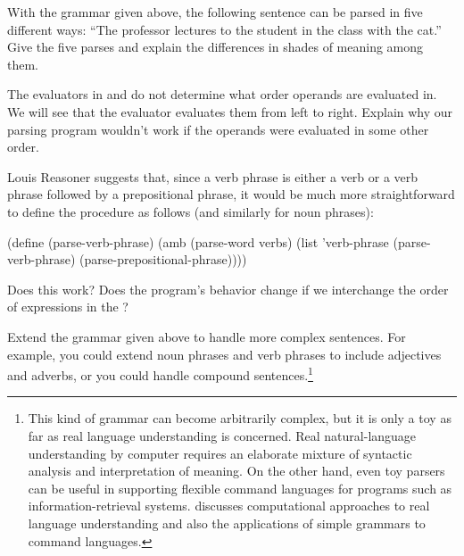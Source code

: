 \begin{exerciseGroup}
\label{Exercise 4.45}
 With the grammar given above, the
following sentence can be parsed in five different ways: ``The professor
lectures to the student in the class with the cat.''  Give the five parses and
explain the differences in shades of meaning among them.

\label{Exercise 4.46}
 The evaluators in
 and  do not determine what order operands are evaluated in.
We will see that the  evaluator evaluates them from left to right.
Explain why our parsing program wouldn't work if the operands were evaluated in
some other order.

\label{Exercise 4.47}
 Louis Reasoner suggests that,
since a verb phrase is either a verb or a verb phrase followed by a
prepositional phrase, it would be much more straightforward to define the
procedure  as follows (and similarly for noun phrases):

\begin{codeBlock}
(define (parse-verb-phrase)
  (amb (parse-word verbs)
       (list 'verb-phrase
             (parse-verb-phrase)
             (parse-prepositional-phrase))))
\end{codeBlock}

Does this work?  Does the program's behavior change if we interchange the order
of expressions in the ?

\label{Exercise 4.48}
 Extend the grammar given above to
handle more complex sentences.  For example, you could extend noun phrases and
verb phrases to include adjectives and adverbs, or you could handle compound
sentences.\footnote{This kind of grammar can become arbitrarily complex, but it
is only a toy as far as real language understanding is concerned.  Real
natural-language understanding by computer requires an elaborate mixture of
syntactic analysis and interpretation of meaning.  On the other hand, even toy
parsers can be useful in supporting flexible command languages for programs
such as information-retrieval systems.   discusses computational
approaches to real language understanding and also the applications of simple
grammars to command languages.}


\end{exerciseGroup}
